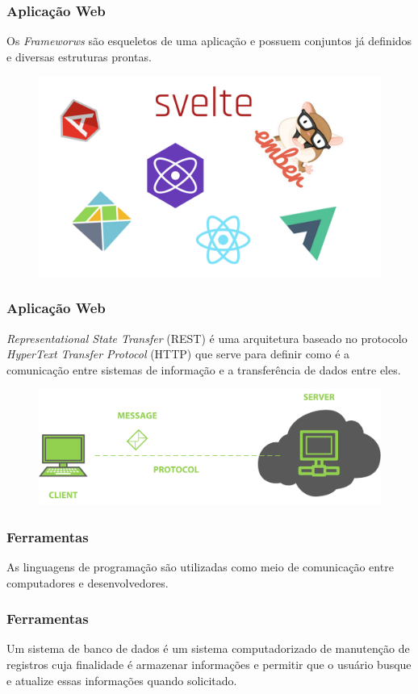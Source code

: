 \documentclass{beamer}
\begin{document}
	\begin{frame}\frametitle{Aplicação Web}
		Os \textit{Frameworws} são esqueletos de uma aplicação e possuem conjuntos já definidos e diversas estruturas prontas.
		\begin{figure}[ht]
			\centering
			\includegraphics[scale=0.2]{img/frameworks.png}
		\end{figure}
	\end{frame}

	\begin{frame}\frametitle{Aplicação Web}
	\textit{Representational State Transfer} (REST) é uma arquitetura baseado no protocolo \textit{HyperText Transfer Protocol} (HTTP) que serve para definir como é a comunicação entre sistemas de informação e a transferência de dados entre eles.
	\begin{figure}[ht]
		\centering
		\includegraphics[scale=0.6]{img/rest.png}
	\end{figure}
	\end{frame}


	\begin{frame}\frametitle{Ferramentas}
		As linguagens de programação são utilizadas como meio de comunicação entre computadores e desenvolvedores.
	\end{frame}
%
%
	\begin{frame}\frametitle{Ferramentas}
		Um sistema de banco de dados é um sistema computadorizado de manutenção
		de registros cuja finalidade é armazenar informações e permitir que o usuário busque e atualize essas informações quando solicitado.
	\end{frame}
\end{document}
